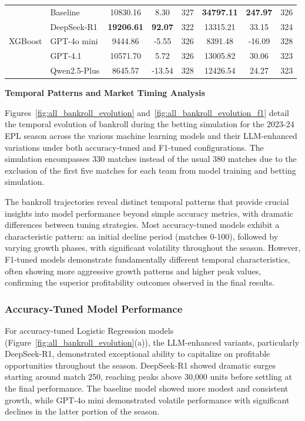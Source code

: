 \documentclass[conference]{IEEEtran}
\begin{document}
\begin{table}[htbp]
\begin{tabular}{l l c c c c c c}
\hline
\multirow{5}{*}{XGBoost}
& Baseline & 10830.16 & 8.30 & 327 & \textbf{34797.11} & \textbf{247.97} & 326 \\
& DeepSeek-R1 & \textbf{19206.61} & \textbf{92.07} & 322 & 13315.21 & 33.15 & 324 \\
& GPT-4o mini & 9444.86 & -5.55 & 326 & 8391.48 & -16.09 & 328 \\
& GPT-4.1 & 10571.70 & 5.72 & 326 & 13005.82 & 30.06 & 323 \\
& Qwen2.5-Plus & 8645.57 & -13.54 & 328 & 12426.54 & 24.27 & 323 \\
\hline
\end{tabular}
\end{table}

\noindent\textbf{Temporal Patterns and Market Timing Analysis}

Figures~\ref{fig:all_bankroll_evolution} and~\ref{fig:all_bankroll_evolution_f1} detail the temporal evolution of bankroll during the betting simulation for the 2023-24 EPL season across the various machine learning models and their LLM-enhanced variations under both accuracy-tuned and F1-tuned configurations. The simulation encompasses 330 matches instead of the usual 380 matches due to the exclusion of the first five matches for each team from model training and betting simulation.

The bankroll trajectories reveal distinct temporal patterns that provide crucial insights into model performance beyond simple accuracy metrics, with dramatic differences between tuning strategies. Most accuracy-tuned models exhibit a characteristic pattern: an initial decline period (matches 0-100), followed by varying growth phases, with significant volatility throughout the season. However, F1-tuned models demonstrate fundamentally different temporal characteristics, often showing more aggressive growth patterns and higher peak values, confirming the superior profitability outcomes observed in the final results.

\subsubsection{Accuracy-Tuned Model Performance}

For accuracy-tuned Logistic Regression models (Figure~\ref{fig:all_bankroll_evolution}(a)), the LLM-enhanced variants, particularly DeepSeek-R1, demonstrated exceptional ability to capitalize on profitable opportunities throughout the season. DeepSeek-R1 showed dramatic surges starting around match 250, reaching peaks above 30,000 units before settling at the final performance. The baseline model showed more modest and consistent growth, while GPT-4o mini demonstrated volatile performance with significant declines in the latter portion of the season.
\end{document}
